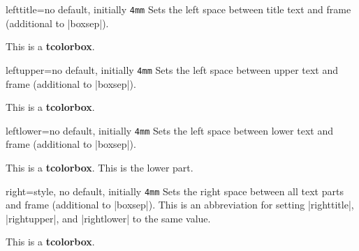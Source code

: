 \begin{docTcbKey}{lefttitle}{=}{no default, initially \texttt{4mm}}
  Sets the left space between title text and frame (additional to |boxsep|).
\begin{dispExample}

\begin{tcolorbox}[lefttitle=3cm,title=My Title]
This is a \textbf{tcolorbox}.
\end{tcolorbox}
\end{dispExample}
\end{docTcbKey}

\begin{docTcbKey}{leftupper}{=}{no default, initially \texttt{4mm}}
  Sets the left space between upper text and frame (additional to |boxsep|).
\begin{dispExample}

\begin{tcolorbox}[leftupper=3cm,title=My Title]
This is a \textbf{tcolorbox}.
\end{tcolorbox}
\end{dispExample}
\end{docTcbKey}

\begin{docTcbKey}{leftlower}{=}{no default, initially \texttt{4mm}}
  Sets the left space between lower text and frame (additional to |boxsep|).
\begin{dispExample}

\begin{tcolorbox}[leftlower=3cm]
This is a \textbf{tcolorbox}.
\tcblower
This is the lower part.
\end{tcolorbox}
\end{dispExample}
\end{docTcbKey}


\clearpage
\begin{docTcbKey}{right}{=}{style, no default, initially \texttt{4mm}}
  Sets the right space between all text parts and frame (additional to |boxsep|).
  This is an abbreviation for setting
  |righttitle|, |rightupper|, and |rightlower| to the same value.
\begin{dispExample}

\begin{tcolorbox}[width=5cm,right=2cm]
This is a \textbf{tcolorbox}.
\end{tcolorbox}
\end{dispExample}
\end{docTcbKey}



